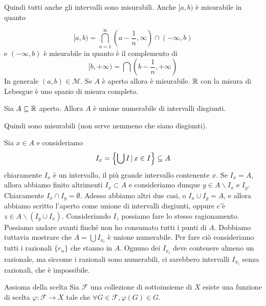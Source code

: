 \documentclass[a4paper]{article}
\begin{document}
Quindi tutti anche gli intervalli sono misurabili.
Anche \([a, b)\) è misurabile in quanto

\[
    [a,b) = \bigcap_{n=1}^\infty \left(a-\frac{1}{n}, \infty\right) \cap (-\infty, b)
\]
e \((-\infty, b)\) è misurabile in quanto è il complemento di
\[
    [b, +\infty) = \bigcap (b-\frac{1}{n}, +\infty)
\]
In generale \((a,b) \in \mathcal{M}\).
Se \(A\) è aperto allora è misurabile.
\(\mathbb{R}\) con la misura di Lebesgue è uno spazio di misura completo.

\begin{snippetproposition}{}
    Sia \(A \subseteq \mathbb{R}\) aperto. Allora
    \(A\) è unione numerabile di intervalli disgiunti.
\end{snippetproposition}

Quindi sono misurabili (non serve nemmeno che siano disgiunti).

\begin{snippetproof}{}
    Sia \(x\in A\) e consideriamo
    \[
        I_x = \left\{\bigcup I \,|\, x\in I\right\} \subseteq A
    \]
    chiaramente \(I_x\) è un intervallo, il più grande intervallo contenente \(x\).
    Se \(I_x = A\), allora abbiamo finito altrimenti \(I_x \subset A\)
    e consideriamo dunque \(y\in A \backslash I_x\) e \(I_y\).
    Chiaramente \(I_x \cap I_y = \emptyset\). Adesso abbiamo altri due casi,
    o \(I_x \cup I_y = A\), e allora abbiamo scritto l'aperto come unione di intervalli disgiunti,
    oppure c'è \(z \in A \backslash (I_y \cup I_x)\). Consideriando \(I_z\) possiamo fare
    lo stesso ragionamento. Possiamo andare avanti finché non ho consumato tutti i punti di \(A\).
    Dobbiamo tuttavia mostrare che \(A = \bigcup I_{x_i}\) è unione numerabile.
    Per fare ciò consideriamo tutti i razionali \(\{r_n\}\) che stanno in \(A\).
    Ognuno dei \(I_{x_i}\) deve contenere almeno un razionale, ma siccome i razionali sono numerabili,
    ci sarebbero intervalli \(I_{x_i}\) senza razionali, che è impossibile.
\end{snippetproof}

\begin{snippetaxiom}{Assioma della scelta}
    Sia \(\mathcal{F}\) una collezione di sottoinsieme di \(X\)
    esiste una funzione di scelta \(\varphi\colon \mathcal{F} \to X\)
    tale che \(\forall G \in \mathcal{F}, \varphi(G) \in G\).
\end{snippetaxiom}
\end{document}
